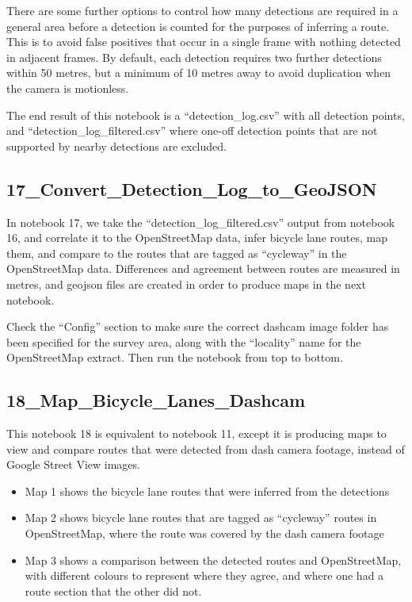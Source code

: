 \documentclass[11pt,twoside]{report}
\begin{document}
There are some further options to control how many detections are required in a general area before a detection is counted for the purposes of inferring a route.  This is to avoid false positives that occur in a single frame with nothing detected in adjacent frames.  By default, each detection requires two further detections within 50 metres, but a minimum of 10 metres away to avoid duplication when the camera is motionless.

The end result of this notebook is a ``detection\_log.csv'' with all detection points, and ``detection\_log\_filtered.csv'' where one-off detection points that are not supported by nearby detections are excluded.


\subsection{17\_Convert\_Detection\_Log\_to\_GeoJSON}
\label{a17}

In notebook 17, we take the ``detection\_log\_filtered.csv'' output from notebook 16, and correlate it to the OpenStreetMap data, infer bicycle lane routes, map them, and compare to the routes that are tagged as ``cycleway'' in the OpenStreetMap data.  Differences and agreement between routes are measured in metres, and geojson files are created in order to produce maps in the next notebook.

Check the ``Config'' section to make sure the correct dashcam image folder has been specified for the survey area, along with the ``locality'' name for the OpenStreetMap extract.  Then run the notebook from top to bottom.


\subsection{18\_Map\_Bicycle\_Lanes\_Dashcam}
\label{a18}

This notebook 18 is equivalent to notebook 11, except it is producing maps to view and compare routes that were detected from dash camera footage, instead of Google Street View images.

\begin{itemize}
\item{Map 1 shows the bicycle lane routes that were inferred from the detections}
\item{Map 2 shows bicycle lane routes that are tagged as ``cycleway'' routes in OpenStreetMap, where the route was covered by the dash camera footage}
\item{Map 3 shows a comparison between the detected routes and OpenStreetMap, with different colours to represent where they agree, and where one had a route section that the other did not.}	
\end{itemize}
\end{document}
